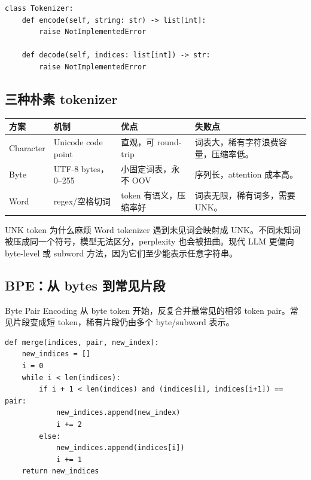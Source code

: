 \documentclass[a4paper]{article}
\begin{document}
\begin{lstlisting}[caption={Tokenizer 抽象接口}]
class Tokenizer:
    def encode(self, string: str) -> list[int]:
        raise NotImplementedError

    def decode(self, indices: list[int]) -> str:
        raise NotImplementedError
\end{lstlisting}

\subsection{三种朴素 tokenizer}

\begin{longtable}{p{}p{}p{}p{}}
\toprule
\textbf{方案} & \textbf{机制} & \textbf{优点} & \textbf{失败点} \\
\midrule
Character & Unicode code point & 直观，可 round-trip & 词表大，稀有字符浪费容量，压缩率低。 \\
Byte & UTF-8 bytes，0--255 & 小固定词表，永不 OOV & 序列长，attention 成本高。 \\
Word & regex/空格切词 & token 有语义，压缩率好 & 词表无限，稀有词多，需要 UNK。 \\
\bottomrule
\end{longtable}

\begin{warningbox}{UNK token 为什么麻烦}
Word tokenizer 遇到未见词会映射成 UNK。不同未知词被压成同一个符号，模型无法区分，perplexity 也会被扭曲。现代 LLM 更偏向 byte-level 或 subword 方法，因为它们至少能表示任意字符串。
\end{warningbox}

\subsection{BPE：从 bytes 到常见片段}

Byte Pair Encoding 从 byte token 开始，反复合并最常见的相邻 token pair。常见片段变成短 token，稀有片段仍由多个 byte/subword 表示。

\begin{lstlisting}[caption={BPE merge 的核心逻辑}]
def merge(indices, pair, new_index):
    new_indices = []
    i = 0
    while i < len(indices):
        if i + 1 < len(indices) and (indices[i], indices[i+1]) == pair:
            new_indices.append(new_index)
            i += 2
        else:
            new_indices.append(indices[i])
            i += 1
    return new_indices
\end{lstlisting}
\end{document}

